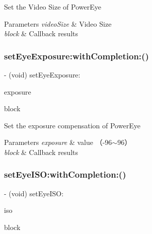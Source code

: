 Set the Video Size of Power\+Eye


\begin{DoxyParams}{Parameters}
{\em video\+Size} & Video Size \\
\hline
{\em block} & Callback results \\
\hline
\end{DoxyParams}
\mbox{\label{interface_p_v_camera_a5c1088dd07d5a5e59a72b3975ac2eca0}} 
\subsubsection{\texorpdfstring{set\+Eye\+Exposure\+:with\+Completion\+:()}{setEyeExposure:withCompletion:()}}
{\footnotesize\ttfamily -\/ (void) set\+Eye\+Exposure\+: \begin{DoxyParamCaption}\item[{(N\+S\+Integer)}]{exposure }\item[{withCompletion:(P\+V\+Completion\+Block)}]{block }\end{DoxyParamCaption}}

Set the exposure compensation of Power\+Eye


\begin{DoxyParams}{Parameters}
{\em exposure} & value （-\/96$\sim$96） \\
\hline
{\em block} & Callback results \\
\hline
\end{DoxyParams}
\mbox{\label{interface_p_v_camera_af16aafd83e9375c1441e0063688369fe}} 
\subsubsection{\texorpdfstring{set\+Eye\+I\+S\+O\+:with\+Completion\+:()}{setEyeISO:withCompletion:()}}
{\footnotesize\ttfamily -\/ (void) set\+Eye\+I\+S\+O\+: \begin{DoxyParamCaption}\item[{(P\+V\+Eye\+Camera\+I\+SO)}]{iso }\item[{withCompletion:(P\+V\+Completion\+Block)}]{block }\end{DoxyParamCaption}}

